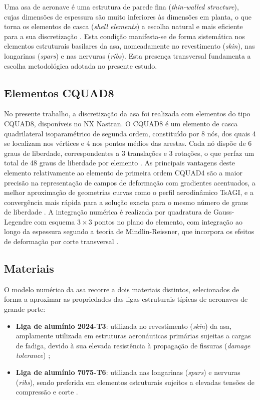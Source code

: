 \documentclass[11pt,oneside,a4paper,final]{report}
\begin{document}
Uma asa de aeronave é uma estrutura de parede fina (\textit{thin-walled structure}), cujas dimensões de espessura são muito inferiores às dimensões em planta, o que torna os elementos de casca (\textit{shell elements}) a escolha natural e mais eficiente para a sua discretização \cite{Bathe2014, Cook2001}. Esta condição manifesta-se de forma sistemática nos elementos estruturais basilares da asa, nomeadamente no revestimento (\textit{skin}), nas longarinas (\textit{spars}) e nas nervuras (\textit{ribs}). Esta presença transversal fundamenta a escolha metodológica adotada no presente estudo.

\subsection{Elementos CQUAD8}

No presente trabalho, a discretização da asa foi realizada com elementos do tipo CQUAD8, disponíveis no NX Nastran. O CQUAD8 é um elemento de casca quadrilateral isoparamétrico de segunda ordem, constituído por 8 nós, dos quais 4 se localizam nos vértices e 4 nos pontos médios das arestas. Cada nó dispõe de 6 graus de liberdade, correspondentes a 3 translações e 3 rotações, o que perfaz um total de 48 graus de liberdade por elemento \cite{Nastran2014, Cook2001}. As principais vantagens deste elemento relativamente ao elemento de primeira ordem CQUAD4 são a maior precisão na representação de campos de deformação com gradientes acentuados, a melhor aproximação de geometrias curvas como o perfil aerodinâmico TsAGI, e a convergência mais rápida para a solução exacta para o mesmo número de graus de liberdade \cite{Bathe2014, Zienkiewicz2005}. A integração numérica é realizada por quadratura de Gauss-Legendre com esquema $3 \times 3$ pontos no plano do elemento, com integração ao longo da espessura segundo a teoria de Mindlin-Reissner, que incorpora os efeitos de deformação por corte transversal \cite{Nastran2014}.

\subsection{Materiais}

O modelo numérico da asa recorre a dois materiais distintos, selecionados de forma a aproximar as propriedades das ligas estruturais típicas de aeronaves de grande porte:

\begin{itemize}
    \item \textbf{Liga de alumínio 2024-T3}: utilizada no revestimento (\textit{skin}) da asa, amplamente utilizada em estruturas aeronáuticas primárias sujeitas a cargas de fadiga, devido à sua elevada resistência à propagação de fissuras (\textit{damage tolerance}) \cite{Megson2012, ASM2008};

    \item \textbf{Liga de alumínio 7075-T6}: utilizada nas longarinas (\textit{spars}) e nervuras (\textit{ribs}), sendo preferida em elementos estruturais sujeitos a elevadas tensões de compressão e corte \cite{Megson2012, ASM2008}.
\end{itemize}
\end{document}
